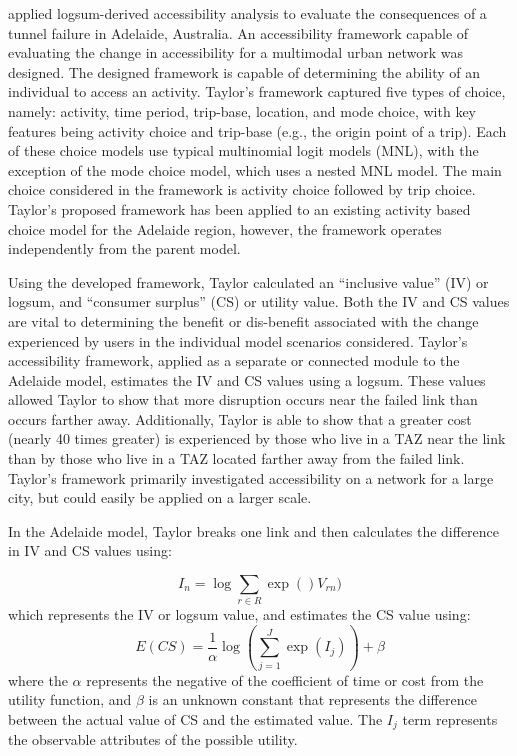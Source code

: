 \citet{taylor2008} applied logsum-derived accessibility analysis to
evaluate the consequences of a tunnel failure in Adelaide, Australia. An
accessibility framework capable of evaluating the change in accessibility
for a multimodal urban network was designed. The designed framework is
capable of determining the ability of an individual to access an activity.
Taylor's framework captured five types of choice, namely: activity, time period,
trip-base, location, and mode choice, with key features being activity
choice and trip-base (e.g., the origin point of a trip). Each of these choice
models use typical multinomial logit models (MNL), with the exception of
the mode choice model, which uses a nested MNL model. The main choice
considered in the framework is activity choice followed by trip choice.
Taylor's proposed framework has been applied to an existing activity based
choice model for the Adelaide region, however, the framework operates
independently from the parent model.

Using the developed framework, Taylor calculated an ``inclusive value'' (IV) or logsum,
and ``consumer surplus'' (CS) or utility value. Both the IV and CS values are vital to
determining the benefit or dis-benefit
associated with the change experienced by users in the individual model
scenarios considered. Taylor's accessibility framework, applied as a separate or connected module to
the Adelaide model, estimates the IV and CS values using a logsum.
These values allowed Taylor to show that more disruption occurs near the
failed link than occurs farther away. Additionally, Taylor is able to show
that a greater cost (nearly 40 times greater) is experienced by those who
live in a TAZ near the link than by those who live in a TAZ located
farther away from the failed link. Taylor's framework primarily
investigated accessibility on a network for a large city,
but could easily be applied on a larger scale.

In the Adelaide model, Taylor breaks one link and
then calculates the difference in IV and CS values using:

	\begin{equation}
		I_n=\log \sum_{r \in R} \exp(){V_{rn})}
	\end{equation}
which represents the IV or logsum value, and estimates the CS value using:
	\begin{equation}
		E(CS) = \frac{1}{\alpha} \log (\sum_{j = 1}^{J} \exp (I_j)) + \beta
			\label{eqn:taylor}
	\end{equation}
\noindent where the \(\alpha\) represents the negative of the coefficient of time or cost from the utility function,
and \(\beta\) is an unknown constant that represents the difference between the actual value of CS and the estimated value.
The \(I_j\) term represents the observable attributes of the possible utility.


